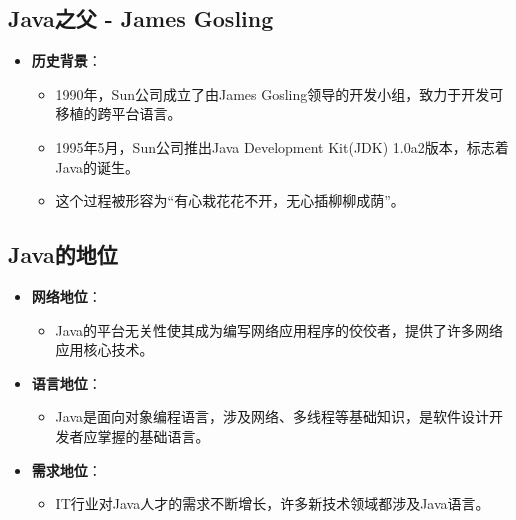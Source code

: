 \documentclass[a4paper, 10pt]{ctexart}
\begin{document}
\subsection{Java之父 - James Gosling}
\begin{itemize}
  \item \textbf{历史背景}：
  \begin{itemize}
    \item 1990年，Sun公司成立了由James Gosling领导的开发小组，致力于开发可移植的跨平台语言。
    \item 1995年5月，Sun公司推出Java Development Kit(JDK) 1.0a2版本，标志着Java的诞生。
    \item 这个过程被形容为“有心栽花花不开，无心插柳柳成荫”。
  \end{itemize}
\end{itemize}

\subsection{Java的地位}
\begin{itemize}
  \item \textbf{网络地位}：
  \begin{itemize}
    \item Java的平台无关性使其成为编写网络应用程序的佼佼者，提供了许多网络应用核心技术。
  \end{itemize}
  \item \textbf{语言地位}：
  \begin{itemize}
    \item Java是面向对象编程语言，涉及网络、多线程等基础知识，是软件设计开发者应掌握的基础语言。
  \end{itemize}
  \item \textbf{需求地位}：
  \begin{itemize}
    \item IT行业对Java人才的需求不断增长，许多新技术领域都涉及Java语言。
  \end{itemize}
\end{itemize}
\end{document}
